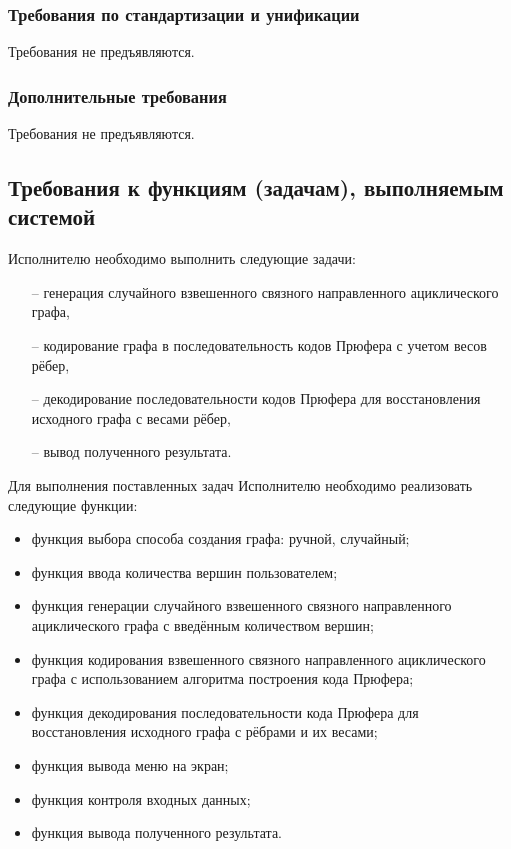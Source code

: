 \documentclass[12pt,a4paper]{article}
\begin{document}
\subsubsection{Требования по стандартизации и унификации}
Требования не предъявляются.

\subsubsection{Дополнительные требования}
Требования не предъявляются.

\subsection{Требования к функциям (задачам), выполняемым системой} \label{functions}
Исполнителю необходимо выполнить следующие задачи:
\begin{itemize} 
    \item[--] генерация случайного взвешенного связного направленного ациклического графа,
    \item[--] кодирование графа в последовательность кодов Прюфера с учетом весов рёбер, 
    \item[--] декодирование последовательности кодов Прюфера для восстановления исходного графа с весами рёбер, 
    \item[--] вывод полученного результата.
\end{itemize}

Для выполнения поставленных задач Исполнителю необходимо реализовать следующие функции:

\begin{itemize}
    \item функция выбора способа создания графа: ручной, случайный;
    \item функция ввода количества вершин пользователем;
    \item функция генерации случайного взвешенного связного направленного ациклического графа с введённым 
    количеством вершин;
    \item функция кодирования взвешенного связного направленного ациклического графа с использованием алгоритма
    построения кода Прюфера;
    \item функция декодирования последовательности кода Прюфера для восстановления исходного графа
    с рёбрами и их весами;
    \item функция вывода меню на экран;
    \item функция контроля входных данных;
    \item функция вывода полученного результата.
\end{itemize}
\end{document}
